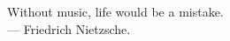 \thispagestyle{empty}
{}

\vspace*{\fill}

\begin{center}
    Without music,   life would be a mistake. \\ \medskip
    --- Friedrich Nietzsche.   
\end{center}

\vspace{5cm}

\begin{center}
   \blindtext
\end{center}

\vspace*{\fill}